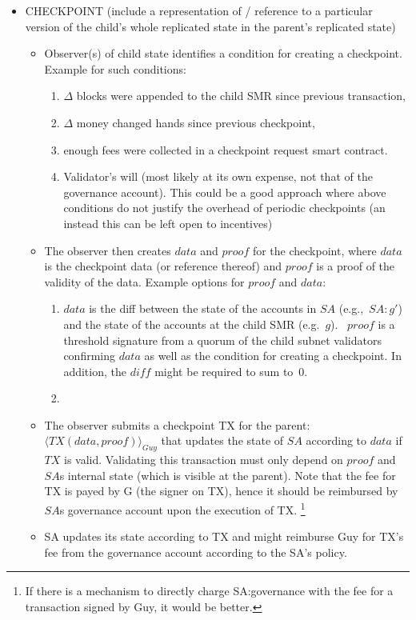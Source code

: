 \begin{itemize}
    \item CHECKPOINT (include a representation of / reference to a particular version of the child's whole replicated state in the parent's replicated state) 
    \begin{itemize}
        \item Observer(s) of child state identifies a condition for creating a checkpoint. Example for such conditions:
        \begin{enumerate}
            \item $\Delta$ blocks were appended to the child SMR since previous transaction,
            \item $\Delta$ money changed hands since previous checkpoint,
            \item enough fees were collected in a checkpoint request smart contract.
            \item Validator's will (most likely at its own expense, not that of the governance account). This could be a good approach where above conditions do not justify the overhead of periodic checkpoints (an instead this can  be left open to incentives)
        \end{enumerate}
        \item The observer then creates $\textit{data}$ and $\textit{proof}$ for the checkpoint, where $\textit{data}$ is the checkpoint data (or reference thereof) and $\textit{proof}$ is a proof of the validity of the data.
        Example options for $\textit{proof}$ and $\textit{data}$:
        \begin{enumerate}
            \item $\textit{data}$ is the diff between the state of the accounts in $SA$ (e.g.,~$SA:g'$) and the state of the accounts at the child SMR (e.g.~$g$). \ $\textit{proof}$ is a threshold signature from a quorum of the child subnet validators confirming $\textit{data}$ as well as the condition for creating a checkpoint. In addition, the $\textit{diff}$ might be required to sum to~0.
            \item {}
        \end{enumerate}
        \item The observer submits a checkpoint TX for the parent:  $\langle TX(\textit{data}, \textit{proof})\rangle_{Guy}$ that updates the state of $SA$ according to $\textit{data}$ if $TX$ is valid.
        Validating this transaction must only depend on $\textit{proof}$ and $SA$s internal state (which is visible at the parent).
        Note that the fee for TX is payed by G (the signer on TX), hence it should be reimbursed by $SA$s governance account upon the execution of TX.%
        \footnote{If there is a mechanism to directly charge SA:governance with the fee for a transaction signed by Guy, it would be better.}
        \item SA updates its state according to TX and might reimburse Guy for TX's fee from the governance account according to the SA's policy.
    \end{itemize}
    

\end{itemize}
